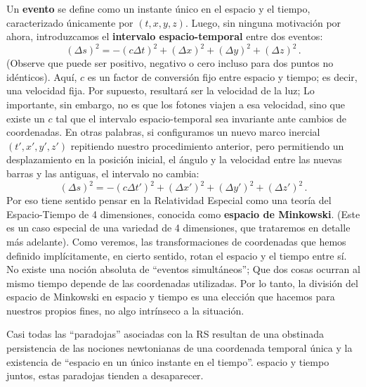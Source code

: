 \documentclass[11pt,b5paper,openany,twoside]{book}
\begin{document}
Un {\bf evento} se define como un instante único en el espacio y el tiempo, caracterizado únicamente por $(t,x,y,z)$.
Luego, sin ninguna motivación por ahora, introduzcamos el {\bf intervalo espacio-temporal} entre dos eventos:
\begin{equation}
(\Delta s)^2 = -(c\Delta t)^2 + (\Delta x)^2 + (\Delta y)^2 + (\Delta z)^2\,.
\label{1.3}
\end{equation}
(Observe que puede ser positivo, negativo o cero incluso para dos puntos no idénticos).
Aquí, $c$ es un factor de conversión fijo entre espacio y tiempo; es decir, una velocidad fija.
Por supuesto, resultará ser la velocidad de la luz; Lo importante, sin embargo, no es que los fotones viajen a esa velocidad, sino que existe un $c$ tal que el intervalo espacio-temporal sea invariante ante cambios de coordenadas.
En otras palabras, si configuramos un nuevo marco inercial $(t',x',y',z')$ repitiendo nuestro procedimiento anterior, pero permitiendo un desplazamiento en la posición inicial, el ángulo y la velocidad entre las nuevas barras y las antiguas, el intervalo no cambia:
\begin{equation}
(\Delta s)^2 = -(c\Delta t')^2 + (\Delta x')^2 + (\Delta y')^2 + (\Delta z')^2\,.
\label{1.4}
\end{equation}
Por eso tiene sentido pensar en la Relatividad Especial como una teoría del Espacio-Tiempo de 4 dimensiones, conocida como {\bf espacio de Minkowski}.
(Este es un caso especial de una variedad de 4 dimensiones, que trataremos en detalle más adelante).
Como veremos, las transformaciones de coordenadas que hemos definido implícitamente, en cierto sentido, rotan el espacio y el tiempo entre sí.
No existe una noción absoluta de ``eventos simultáneos''; Que dos cosas ocurran al mismo tiempo depende de las coordenadas utilizadas.
Por lo tanto, la división del espacio de Minkowski en espacio y tiempo es una elección que hacemos para nuestros propios fines, no algo intrínseco a la situación.

Casi todas las ``paradojas'' asociadas con la RS resultan de una obstinada persistencia de las nociones newtonianas de una coordenada temporal única y la existencia de ``espacio en un único instante en el tiempo''. espacio y tiempo juntos, estas paradojas tienden a desaparecer.
\end{document}
